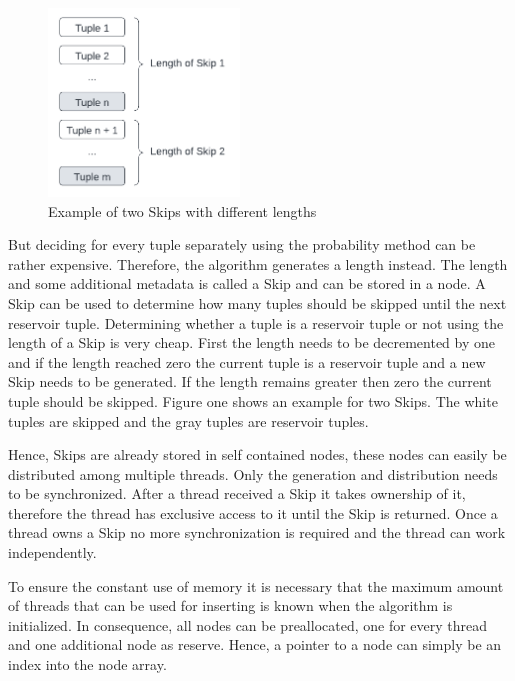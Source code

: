 \documentclass[acmlarge,nonacm]{acmart}
\begin{document}
        \begin{figure}
            \centering
            \includegraphics[height=5cm]{figure1.pdf}
            \caption{Example of two Skips with different lengths}
        \end{figure}
        But deciding for every tuple separately using the probability method can be rather expensive. Therefore, the algorithm generates a length instead. The length and some additional metadata is called a Skip and can be stored in a node. A Skip can be used to determine how many tuples should be skipped until the next reservoir tuple. Determining whether a tuple is a reservoir tuple or not using the length of a Skip is very cheap. First the length needs to be decremented by one and if the length reached zero the current tuple is a reservoir tuple and a new Skip needs to be generated. If the length remains greater then zero the current tuple should be skipped. Figure one shows an example for two Skips. The white tuples are skipped and the gray tuples are reservoir tuples.

        Hence, Skips are already stored in self contained nodes, these nodes can easily be distributed among multiple threads. Only the generation and distribution needs to be synchronized. After a thread received a Skip it takes ownership of it, therefore the thread has exclusive access to it until the Skip is returned. Once a thread owns a Skip no more synchronization is required and the thread can work independently. 

        To ensure the constant use of memory it is necessary that the maximum amount of threads that can be used for inserting is known when the algorithm is initialized. In consequence, all nodes can be preallocated, one for every thread and one additional node as reserve. Hence, a pointer to a node can simply be an index into the node array.
\end{document}
